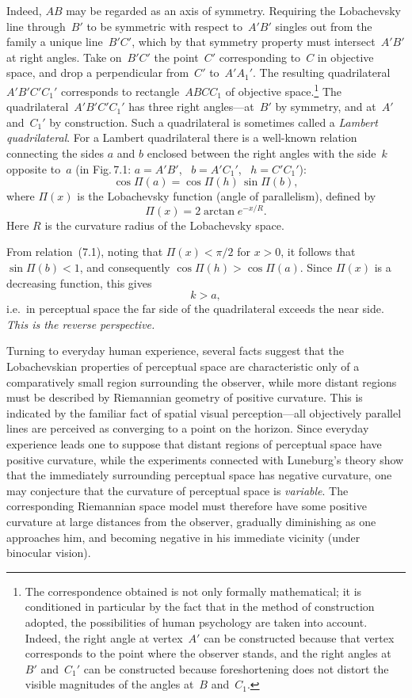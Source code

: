 Indeed, $AB$ may be regarded as an axis of symmetry.  Requiring the Lobachevsky line
through~$B'$ to be symmetric with respect to~$A'B'$ singles out from the family a unique
line~$B'C'$, which by that symmetry property must intersect~$A'B'$ at right angles.  Take
on~$B'C'$ the point~$C'$ corresponding to~$C$ in objective space, and drop a perpendicular
from~$C'$ to~$A'A_1'$.  The resulting quadrilateral~$A'B'C'C_1'$ corresponds to
rectangle~$ABCC_1$ of objective space.\footnote{The correspondence obtained is not only
  formally mathematical; it is conditioned in particular by the fact that in the method of
  construction adopted, the possibilities of human psychology are taken into account.
  Indeed, the right angle at vertex~$A'$ can be constructed because that vertex corresponds
  to the point where the observer stands, and the right angles at~$B'$ and~$C_1'$ can be
  constructed because foreshortening does not distort the visible magnitudes of the angles
  at~$B$ and~$C_1$.}
The quadrilateral~$A'B'C'C_1'$ has three right angles---at~$B'$ by symmetry, and at~$A'$
and~$C_1'$ by construction.  Such a quadrilateral is sometimes called a \emph{Lambert
quadrilateral}.  For a Lambert quadrilateral there is a well-known relation connecting the
sides $a$ and $b$ enclosed between the right angles with the side~$k$ opposite to~$a$
(in Fig.\,7.1: $a = A'B'$, \, $b = A'C_1'$, \, $h = C'C_1'$):
\begin{equation}
  \cos\Pi(a) = \cos\Pi(h)\,\sin\Pi(b),  \tag{7.1}
\end{equation}
where $\Pi(x)$ is the Lobachevsky function (angle of parallelism), defined by
\begin{equation}
  \Pi(x) = 2\arctan e^{-x/R}.  \tag{7.2}
\end{equation}
Here $R$ is the curvature radius of the Lobachevsky space.


From relation~(7.1), noting that $\Pi(x) < \pi/2$ for $x > 0$, it follows that
$\sin\Pi(b) < 1$, and consequently $\cos\Pi(h) > \cos\Pi(a)$.  Since $\Pi(x)$ is a
decreasing function, this gives
\[
  k > a,
\]
i.e.\ in perceptual space the far side of the quadrilateral exceeds the near side.
\emph{This is the reverse perspective.}

Turning to everyday human experience, several facts suggest that the Lobachevskian
properties of perceptual space are characteristic only of a comparatively small region
surrounding the observer, while more distant regions must be described by Riemannian
geometry of positive curvature.  This is indicated by the familiar fact of spatial visual
perception---all objectively parallel lines are perceived as converging to a point on the
horizon.  Since everyday experience leads one to suppose that distant regions of perceptual
space have positive curvature, while the experiments connected with Luneburg's theory show
that the immediately surrounding perceptual space has negative curvature, one may conjecture
that the curvature of perceptual space is \emph{variable}.  The corresponding Riemannian
space model must therefore have some positive curvature at large distances from the
observer, gradually diminishing as one approaches him, and becoming negative in his
immediate vicinity (under binocular vision).

